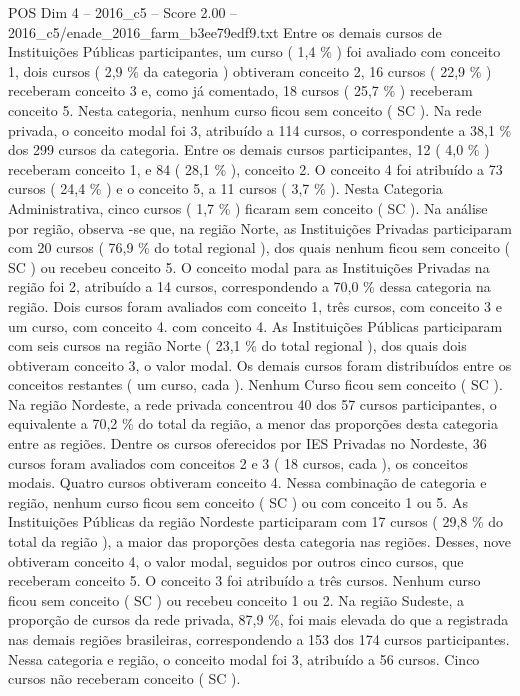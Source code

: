 \begin{textsample}{POS Dim 4 – 2016\_c5 – Score 2.00 – 2016\_c5/enade\_2016\_farm\_b3ee79edf9.txt}
Entre os demais cursos de Instituições Públicas participantes, um curso ( 1,4 \% ) foi avaliado com conceito 1, dois cursos ( 2,9 \% da categoria ) obtiveram conceito 2, 16 cursos ( 22,9 \% ) receberam conceito 3 e, como já comentado, 18 cursos ( 25,7 \% ) receberam conceito 5.
Nesta categoria, nenhum curso ficou sem conceito ( SC ).
Na rede privada, o conceito modal foi 3, atribuído a 114 cursos, o correspondente a 38,1 \% dos 299 cursos da categoria.
Entre os demais cursos participantes, 12 ( 4,0 \% ) receberam conceito 1, e 84 ( 28,1 \% ), conceito 2.
O conceito 4 foi atribuído a 73 cursos ( 24,4 \% ) e o conceito 5, a 11 cursos ( 3,7 \% ).
Nesta Categoria Administrativa, cinco cursos ( 1,7 \% ) ficaram sem conceito ( SC ).
Na análise por região, observa -se que, na região Norte, as Instituições Privadas participaram com 20 cursos ( 76,9 \% do total regional ), dos quais nenhum ficou sem conceito ( SC ) ou recebeu conceito 5.
O conceito modal para as Instituições Privadas na região foi 2, atribuído a 14 cursos, correspondendo a 70,0 \% dessa categoria na região.
Dois cursos foram avaliados com conceito 1, três cursos, com conceito 3 e um curso, com conceito 4. com conceito 4.
As Instituições Públicas participaram com seis cursos na região Norte ( 23,1 \% do total regional ), dos quais dois obtiveram conceito 3, o valor modal.
Os demais cursos foram distribuídos entre os conceitos restantes ( um curso, cada ).
Nenhum Curso ficou sem conceito ( SC ).
Na região Nordeste, a rede privada concentrou 40 dos 57 cursos participantes, o equivalente a 70,2 \% do total da região, a menor das proporções desta categoria entre as regiões.
Dentre os cursos oferecidos por IES Privadas no Nordeste, 36 cursos foram avaliados com conceitos 2 e 3 ( 18 cursos, cada ), os conceitos modais.
Quatro cursos obtiveram conceito 4.
Nessa combinação de categoria e região, nenhum curso ficou sem conceito ( SC ) ou com conceito 1 ou 5.
As Instituições Públicas da região Nordeste participaram com 17 cursos ( 29,8 \% do total da região ), a maior das proporções desta categoria nas regiões.
Desses, nove obtiveram conceito 4, o valor modal, seguidos por outros cinco cursos, que receberam conceito 5.
O conceito 3 foi atribuído a três cursos.
Nenhum curso ficou sem conceito ( SC ) ou recebeu conceito 1 ou 2.
Na região Sudeste, a proporção de cursos da rede privada, 87,9 \%, foi mais elevada do que a registrada nas demais regiões brasileiras, correspondendo a 153 dos 174 cursos participantes.
Nessa categoria e região, o conceito modal foi 3, atribuído a 56 cursos.
Cinco cursos não receberam conceito ( SC ).

\end{textsample}
